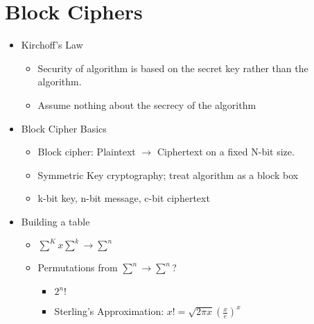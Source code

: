 \section{Block Ciphers}
\begin{itemize}
\item Kirchoff's Law
    \begin{itemize}
    \item Security of algorithm is based on the secret key rather than the algorithm.
    \item Assume nothing about the secrecy of the algorithm
    \end{itemize}
\item Block Cipher Basics
    \begin{itemize}
    \item Block cipher: Plaintext $\rightarrow$ Ciphertext on a fixed N-bit size. 
    \item Symmetric Key cryptography; treat algorithm as a block box
    \item k-bit key, n-bit message, c-bit ciphertext
    \end{itemize}
\item Building a table
    \begin{itemize}
    \item $\sum^K x \sum^k \rightarrow \sum^n$
    \item Permutations from $\sum^n \rightarrow \sum^n$?
        \begin{itemize}
        \item $2^n!$
        \item Sterling's Approximation: $x! = \sqrt{2\pi x} (\frac{x}{e})^x $
        \end{itemize}
    \end{itemize}
\end{itemize}
